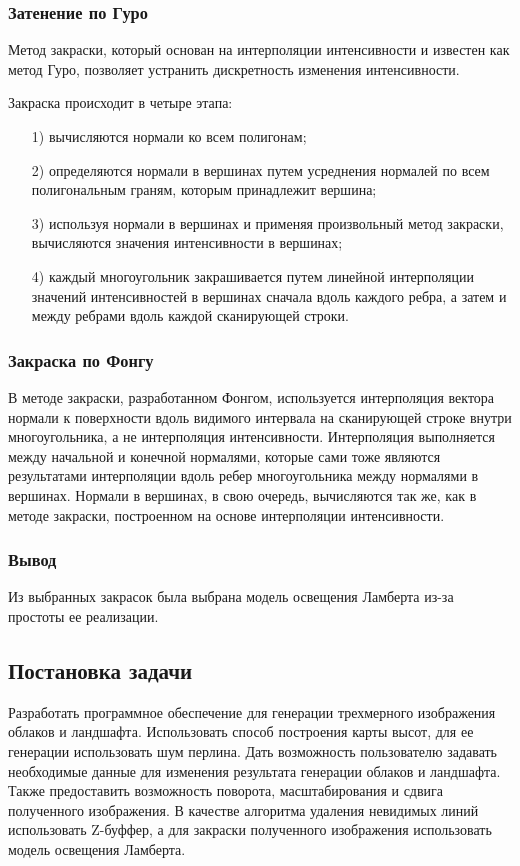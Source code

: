 \documentclass[14pt, a4paper]{extarticle}
\begin{document}
\subsubsection{Затенение по Гуро}
Метод закраски, который основан на интерполяции интенсивности и известен как метод Гуро, позволяет устранить дискретность изменения интенсивности.\par
Закраска происходит в четыре этапа:
\begin{enumerate}
	\item[1)] вычисляются нормали ко всем полигонам;
	\item[2)] определяются нормали в вершинах путем усреднения нормалей по всем полигональным граням, которым принадлежит вершина;
	\item[3)] используя нормали в вершинах и применяя произвольный метод закраски, вычисляются значения интенсивности в вершинах;
	\item[4)] каждый многоугольник закрашивается путем линейной интерполяции значений интенсивностей в вершинах сначала вдоль каждого ребра, а затем и между ребрами вдоль каждой сканирующей строки. 
\end{enumerate}
\subsubsection{Закраска по Фонгу}
В методе закраски, разработанном Фонгом, используется интерполяция вектора нормали к поверхности вдоль видимого интервала на сканирующей строке внутри многоугольника, а не интерполяция интенсивности. Интерполяция выполняется между начальной и конечной нормалями, которые сами тоже являются результатами интерполяции вдоль ребер многоугольника между нормалями в вершинах. Нормали в вершинах, в свою очередь, вычисляются так же, как в методе закраски, построенном на основе интерполяции интенсивности.
\subsubsection{Вывод}
Из выбранных закрасок была выбрана модель освещения Ламберта из-за простоты ее реализации.
\subsection{Постановка задачи}
Разработать программное обеспечение для генерации трехмерного изображения облаков и ландшафта. Использовать способ построения карты высот, для ее генерации использовать шум перлина. Дать возможность пользователю задавать необходимые данные для изменения результата генерации облаков и ландшафта. Также предоставить возможность поворота, масштабирования и сдвига полученного изображения. В качестве алгоритма удаления невидимых линий использовать Z-буффер, а для закраски полученного изображения использовать модель освещения Ламберта.
\end{document}
